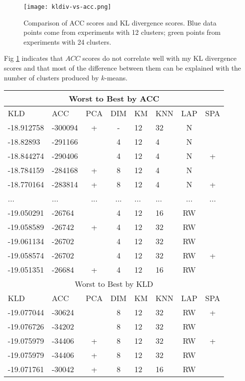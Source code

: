 \documentclass{article}
\begin{document}
\begin{figure}[ht]
    \centering
    \texttt{[image: kldiv-vs-acc.png]}
    \caption{Comparison of ACC scores and KL divergence scores. Blue data points come from experiments with 12 clusters; green points from experiments with 24 clusters.}
    \label{kld_vs_acc}
\end{figure}

Fig \ref{kld_vs_acc} indicates that $ACC$ scores do not correlate well with my KL divergence scores and that most of the difference between them can be explained with the number of clusters produced by $k$-means.

\begin{table}[ht]
    \centering
    \begin{tabular}{|l|l|c|c|l|l|c|c}
    \multicolumn{8}{c}{Worst to Best by ACC} \\\hline
    KLD & ACC & PCA & DIM & KM & KNN & LAP & SPA \\\hline
    -18.912758 & -300094 & + & - & 12 & 32 & N & \\
    -18.82893 & -291166 &  & 4 & 12 & 4 & N & \\
    -18.844274 & -290406 &  & 4 & 12 & 4 & N & +\\
    -18.784159 & -284168 & + & 8 & 12 & 4 & N & \\
    -18.770164 & -283814 & + & 8 & 12 & 4 & N & +\\
    ... & ... & ... & ... & ... & ... & ... & ...\\
    -19.050291 & -26764 &  & 4 & 12 & 16 & RW & \\
    -19.058589 & -26742 & + & 4 & 12 & 32 & RW & \\
    -19.061134 & -26702 &  & 4 & 12 & 32 & RW & \\
    -19.058574 & -26702 &  & 4 & 12 & 32 & RW & +\\
    -19.051351 & -26684 & + & 4 & 12 & 16 & RW & \\
    \multicolumn{8}{c}{Worst to Best by KLD} \\\hline
    KLD & ACC & PCA & DIM & KM & KNN & LAP & SPA \\\hline
    -19.077044 & -30624 &  & 8 & 12 & 32 & RW & +\\
    -19.076726 & -34202 &  & 8 & 12 & 32 & RW & \\
    -19.075979 & -34406 & + & 8 & 12 & 32 & RW & +\\
    -19.075979 & -34406 & + & 8 & 12 & 32 & RW & \\
    -19.071761 & -30042 & + & 8 & 12 & 16 & RW & \\

\end{tabular}
\end{table}
\end{document}
